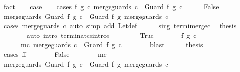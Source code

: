 \begin{isabellebody}
\ fact\isanewline
\ \ \isamarkupfalse%
\ {\isacharquery}case\isanewline
\ \ \isamarkupfalse%
\ {\isacharparenleft}cases\ {\isachardoublequoteopen}{\isasymexists}f{\isacharprime}\ g{\isacharprime}\ c{\isacharprime}{\isachardot}\ merge{\isacharunderscore}guards\ c\ {\isacharequal}\ Guard\ f{\isacharprime}\ g{\isacharprime}\ c{\isacharprime}{\isachardoublequoteclose}{\isacharparenright}\isanewline
\ \ \ \ \isamarkupfalse%
\ False\isanewline
\ \ \ \ \isamarkupfalse%
\ {\isachardoublequoteopen}merge{\isacharunderscore}guards\ {\isacharparenleft}Guard\ f\ g\ c{\isacharparenright}\ {\isacharequal}\ Guard\ f\ g\ {\isacharparenleft}merge{\isacharunderscore}guards\ c{\isacharparenright}{\isachardoublequoteclose}\isanewline
\ \ \ \ \ \ \isamarkupfalse%
\ {\isacharparenleft}cases\ {\isachardoublequoteopen}merge{\isacharunderscore}guards\ c{\isachardoublequoteclose}{\isacharparenright}\ {\isacharparenleft}auto\ simp\ add{\isacharcolon}\ Let{\isacharunderscore}def{\isacharparenright}\isanewline
\ \ \ \ \isamarkupfalse%
\ s{\isacharunderscore}in{\isacharunderscore}g\ termi{\isacharunderscore}merge{\isacharunderscore}c\ \isamarkupfalse%
\ {\isacharquery}thesis\isanewline
\ \ \ \ \ \ \isamarkupfalse%
\ {\isacharparenleft}auto\ intro{\isacharcolon}\ terminates{\isachardot}intros{\isacharparenright}\isanewline
\ \ \isamarkupfalse%
\isanewline
\ \ \ \ \isamarkupfalse%
\ True\isanewline
\ \ \ \ \isamarkupfalse%
\ \isamarkupfalse%
\ f{\isacharprime}\ g{\isacharprime}\ c{\isacharprime}\ \ \isanewline
\ \ \ \ \ \ mc{\isacharcolon}\ {\isachardoublequoteopen}merge{\isacharunderscore}guards\ c\ {\isacharequal}\ Guard\ f{\isacharprime}\ g{\isacharprime}\ c{\isacharprime}{\isachardoublequoteclose}\isanewline
\ \ \ \ \ \ \isamarkupfalse%
\ blast\isanewline
\ \ \ \ \isamarkupfalse%
\ {\isacharquery}thesis\isanewline
\ \ \ \ \isamarkupfalse%
\ {\isacharparenleft}cases\ {\isachardoublequoteopen}f{\isacharequal}f{\isacharprime}{\isachardoublequoteclose}{\isacharparenright}\isanewline
\ \ \ \ \ \ \isamarkupfalse%
\ False\isanewline
\ \ \ \ \ \ \isamarkupfalse%
\ mc\ \isamarkupfalse%
\ {\isachardoublequoteopen}merge{\isacharunderscore}guards\ {\isacharparenleft}Guard\ f\ g\ c{\isacharparenright}\ {\isacharequal}\ Guard\ f\ g\ {\isacharparenleft}merge{\isacharunderscore}guards\ c{\isacharparenright}{\isachardoublequoteclose}\isanewline

\end{isabellebody}
